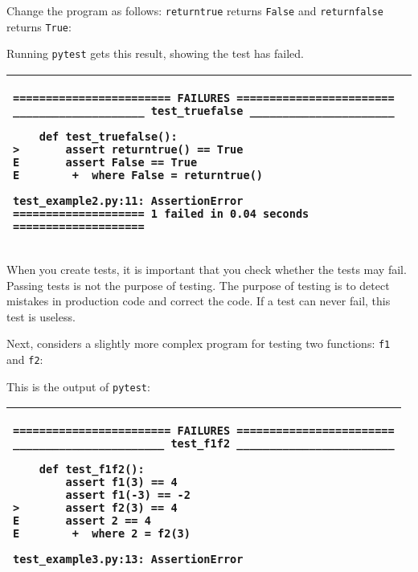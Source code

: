 Change the program  as follows: {\tt returntrue} returns {\tt False}
and {\tt returnfalse} returns {\tt True}:

\resetlinenumber[1]
\linenumbers
\begin{tt}
  
\end{tt}
\nolinenumbers

Running {\tt pytest} gets this result, showing the test has failed.


\vspace{0.2in}

\noindent
\begin{tabular}{|p{5in}|}\hline
\begin{verbatim}
======================== FAILURES ========================
____________________ test_truefalse ______________________

    def test_truefalse():
>       assert returntrue() == True
E       assert False == True
E        +  where False = returntrue()

test_example2.py:11: AssertionError
==================== 1 failed in 0.04 seconds ====================
\end{verbatim}
\\ \hline
\end{tabular}
\vspace{0.2in}


When you create tests, it is important that you check whether the
tests may fail. Passing tests is not the purpose of testing.  The
purpose of testing is to detect mistakes in production code and
correct the code.  If a test can never fail, this test is useless.

Next, considers a slightly more complex program for testing two
functions: {\tt f1} and {\tt f2}:

\resetlinenumber[1]
\linenumbers
\begin{tt}
  
\end{tt}
\nolinenumbers

This is the output of {\tt pytest}:

\vspace{0.2in}

\noindent
\begin{tabular}{|p{5in}|}\hline
\begin{verbatim}
======================== FAILURES ========================
_______________________ test_f1f2 ________________________

    def test_f1f2():
        assert f1(3) == 4
        assert f1(-3) == -2
>       assert f2(3) == 4
E       assert 2 == 4
E        +  where 2 = f2(3)

test_example3.py:13: AssertionError
\end{verbatim}
\\ \hline
\end{tabular}
\vspace{0.2in}


